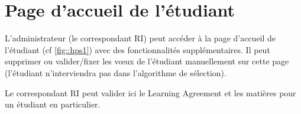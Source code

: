 \section{Page d'accueil de l'étudiant}

L'administrateur (le correspondant RI) peut accéder à la page d'accueil de l'étudiant (cf \ref{fig::hps1}) avec des fonctionnalités supplémentaires.
Il peut supprimer ou valider/fixer les vœux de l'étudiant manuellement sur cette page (l'étudiant n'interviendra pas dans l'algorithme de sélection).

Le correspondant RI peut valider ici le Learning Agreement et les matières pour un étudiant en particulier.